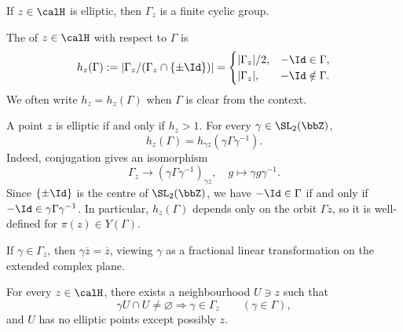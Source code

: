 \begin{proposition}\label{Prop:MF_elliptic_stabilizer}
    If $z \in \calH$ is elliptic, then $\Gamma_z$ is a finite cyclic group.
\end{proposition}


\begin{definition}[Period]\label{Def:MF_elliptic_period}
    The  of $z \in \calH$ with respect to $\Gamma$ is
    \[
        h_z(\Gamma) := \left|\Gamma_z/(\Gamma_z \cap \{\pm\Id\})\right| = \begin{cases}|\Gamma_z|/2, & -\Id \in \Gamma,\\ |\Gamma_z|, & -\Id \notin \Gamma.\end{cases}
    \]
    We often write $h_z = h_z(\Gamma)$ when $\Gamma$ is clear from the context.
\end{definition}

\begin{remark}
    A point $z$ is elliptic if and only if $h_z > 1$. For every $\gamma \in \SL_2(\bbZ)$,
    \[
        h_z(\Gamma) = h_{\gamma z}(\gamma\Gamma\gamma^{-1}).
    \]
    Indeed, conjugation gives an isomorphism
    \[
        \Gamma_z \longrightarrow (\gamma\Gamma\gamma^{-1})_{\gamma z}, \quad g \longmapsto \gamma g\gamma^{-1}.
    \]
    Since $\{\pm\Id\}$ is the centre of $\SL_2(\bbZ)$, we have $-\Id \in \Gamma$ if and only if $-\Id \in \gamma\Gamma\gamma^{-1}$. In particular, $h_z(\Gamma)$ depends only on the orbit $\Gamma z$, so it is well-defined for $\pi(z) \in Y(\Gamma)$.
\end{remark}

\begin{remark}
    If $\gamma \in \Gamma_z$, then $\gamma\overline z = \overline z$, viewing $\gamma$ as a fractional linear transformation on the extended complex plane.
\end{remark}

\begin{corollary}\label{Cor:MF_isolated_elliptic_points}
    For every $z \in \calH$, there exists a neighbourhood $U \ni z$ such that
    \[
        \gamma U \cap U \neq \varnothing \Longrightarrow \gamma \in \Gamma_z \qquad (\gamma \in \Gamma),
    \]
    and $U$ has no elliptic points except possibly $z$.
\end{corollary}

